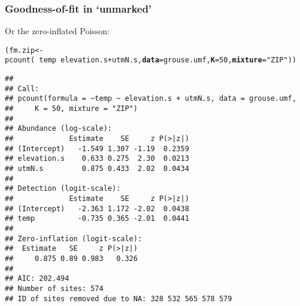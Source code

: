 \documentclass[color=usenames,dvipsnames]{beamer}\usepackage[]{graphicx}\usepackage[]{xcolor}
\makeatletter
\newcommand{\hlnum}[1]{\textcolor[rgb]{0.69,0.494,0}{#1}}%
\newcommand{\hlsng}[1]{\textcolor[rgb]{0.749,0.012,0.012}{#1}}%
\newcommand{\hlopt}[1]{\textcolor[rgb]{0,0,0}{#1}}%
\newcommand{\hldef}[1]{\textcolor[rgb]{0,0,0}{#1}}%
\newcommand{\hlkwb}[1]{\textcolor[rgb]{0,0.341,0.682}{#1}}%
\newcommand{\hlkwc}[1]{\textcolor[rgb]{0,0,0}{\textbf{#1}}}%
\newcommand{\hlkwd}[1]{\textcolor[rgb]{0.004,0.004,0.506}{#1}}%
\newenvironment{kframe}{%
 \def\at@end@of@kframe{}%
 \ifinner\ifhmode%
  \def\at@end@of@kframe{\end{minipage}}%
  \begin{minipage}{\columnwidth}%
 \fi\fi%
 \def\FrameCommand##1{\hskip\@totalleftmargin \hskip-\fboxsep
 \colorbox{shadecolor}{##1}\hskip-\fboxsep
     \hskip-\linewidth \hskip-\@totalleftmargin \hskip\columnwidth}%
 \MakeFramed {\advance\hsize-\width
   \@totalleftmargin\z@ \linewidth\hsize
   \@setminipage}}%
 {\par\unskip\endMakeFramed%
 \at@end@of@kframe}
\newenvironment{knitrout}{}{} %
\makeatother
\begin{document}
\begin{frame}[fragile]
  \frametitle{Goodness-of-fit in `unmarked'}
  \small
  Or the zero-inflated Poisson:
\begin{knitrout}\tiny
{}\color{fgcolor}\begin{kframe}
\begin{alltt}
\hldef{(fm.zip} \hlkwb{<-} \hlkwd{pcount}\hldef{(}\hlopt{~}\hldef{temp} \hlopt{~} \hldef{elevation.s}\hlopt{+}\hldef{utmN.s,} \hlkwc{data}\hldef{=grouse.umf,} \hlkwc{K}\hldef{=}\hlnum{50}\hldef{,} \hlkwc{mixture}\hldef{=}\hlsng{"ZIP"}\hldef{))}
\end{alltt}
\begin{verbatim}
## 
## Call:
## pcount(formula = ~temp ~ elevation.s + utmN.s, data = grouse.umf, 
##     K = 50, mixture = "ZIP")
## 
## Abundance (log-scale):
##             Estimate    SE     z P(>|z|)
## (Intercept)   -1.549 1.307 -1.19  0.2359
## elevation.s    0.633 0.275  2.30  0.0213
## utmN.s         0.875 0.433  2.02  0.0434
## 
## Detection (logit-scale):
##             Estimate    SE     z P(>|z|)
## (Intercept)   -2.363 1.172 -2.02  0.0438
## temp          -0.735 0.365 -2.01  0.0441
## 
## Zero-inflation (logit-scale):
##  Estimate   SE     z P(>|z|)
##     0.875 0.89 0.983   0.326
## 
## AIC: 202.494 
## Number of sites: 574
## ID of sites removed due to NA: 328 532 565 578 579
\end{verbatim}
\end{kframe}
\end{knitrout}
\end{frame}










\end{document}
